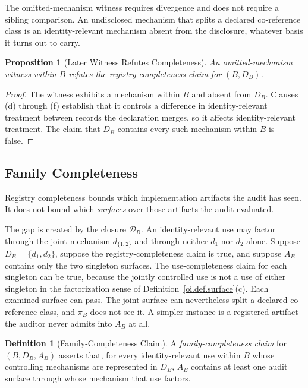 \documentclass[11pt]{article}
\theoremstyle{plain}
\newtheorem{proposition}[theorem]{Proposition}
\theoremstyle{definition}
\newtheorem{definition}[theorem]{Definition}
\theoremstyle{remark}
\begin{document}
The omitted-mechanism witness requires divergence and does not require a sibling comparison.
An undisclosed mechanism that splits a declared co-reference class
is an identity-relevant mechanism absent from the disclosure,
whatever basis it turns out to carry.

\begin{proposition}[Later Witness Refutes Completeness]
  \label{oi.prop.refutes-completeness}
  An omitted-mechanism witness within \(B\)
  refutes the registry-completeness claim for \((B,D_B)\).
\end{proposition}

\begin{proof}
  The witness exhibits a mechanism within \(B\) and absent from \(D_B\).
  Clauses (d) through (f) establish that it controls a difference
  in identity-relevant treatment between records the declaration merges,
  so it affects identity-relevant treatment.
  The claim that \(D_B\) contains every such mechanism within \(B\) is false.
\end{proof}

\subsection{Family Completeness}

Registry completeness bounds which implementation artifacts the audit has seen.
It does not bound which \emph{surfaces} over those artifacts the audit evaluated.

The gap is created by the closure \(\mathcal{D}_B\).
An identity-relevant use may factor through the joint mechanism \(d_{\{1,2\}}\)
and through neither \(d_1\) nor \(d_2\) alone.
Suppose \(D_B=\{d_1,d_2\}\), suppose the registry-completeness claim is true,
and suppose \(A_B\) contains only the two singleton surfaces.
The use-completeness claim for each singleton can be true,
because the jointly controlled use is not a use of either singleton
in the factorization sense of Definition~\ref{oi.def.surface}(c).
Each examined surface can pass.
The joint surface can nevertheless split a declared co-reference class,
and \(\pi_B\) does not see it.
A simpler instance is a registered artifact
the auditor never admits into \(A_B\) at all.

\begin{definition}[Family-Completeness Claim]
  \label{oi.def.familycomplete}
  A \emph{family-completeness claim} for \((B,D_B,A_B)\)
  asserts that, for every identity-relevant use within \(B\)
  whose controlling mechanisms are represented in \(D_B\),
  \(A_B\) contains at least one audit surface
  through whose mechanism that use factors.
\end{definition}
\end{document}
